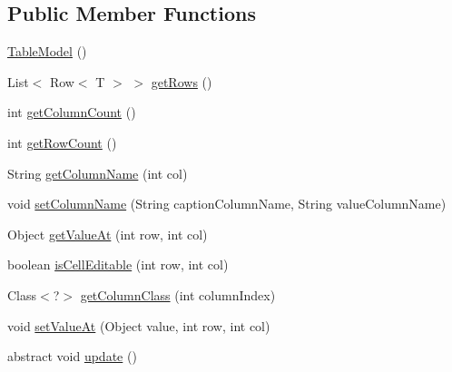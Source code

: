 \subsection*{Public Member Functions}
\begin{DoxyCompactItemize}
\item 
\hyperlink{classorg_1_1tzi_1_1use_1_1gui_1_1views_1_1selection_1_1_table_model_3_01_t_01_4_a16f7c6313c88dd4999036656af0accc9}{Table\-Model} ()
\item 
List$<$ Row$<$ T $>$ $>$ \hyperlink{classorg_1_1tzi_1_1use_1_1gui_1_1views_1_1selection_1_1_table_model_3_01_t_01_4_a46b8d7bab4b7870f022a4f12d6571108}{get\-Rows} ()
\item 
int \hyperlink{classorg_1_1tzi_1_1use_1_1gui_1_1views_1_1selection_1_1_table_model_3_01_t_01_4_ab132ea80bf2adb4d18b58912a6caa40a}{get\-Column\-Count} ()
\item 
int \hyperlink{classorg_1_1tzi_1_1use_1_1gui_1_1views_1_1selection_1_1_table_model_3_01_t_01_4_a438db9b60f02813f4e7b59530810dff0}{get\-Row\-Count} ()
\item 
String \hyperlink{classorg_1_1tzi_1_1use_1_1gui_1_1views_1_1selection_1_1_table_model_3_01_t_01_4_a64557d5fd2ad4e112a0c11144570a557}{get\-Column\-Name} (int col)
\item 
void \hyperlink{classorg_1_1tzi_1_1use_1_1gui_1_1views_1_1selection_1_1_table_model_3_01_t_01_4_a6373f383d0f22cdaef0c248a069d55da}{set\-Column\-Name} (String caption\-Column\-Name, String value\-Column\-Name)
\item 
Object \hyperlink{classorg_1_1tzi_1_1use_1_1gui_1_1views_1_1selection_1_1_table_model_3_01_t_01_4_ae2acd70d11e4b3e314967b1f80d155b6}{get\-Value\-At} (int row, int col)
\item 
boolean \hyperlink{classorg_1_1tzi_1_1use_1_1gui_1_1views_1_1selection_1_1_table_model_3_01_t_01_4_aaa0e99a59af0d4fa9681d0f3dd00b615}{is\-Cell\-Editable} (int row, int col)
\item 
Class$<$?$>$ \hyperlink{classorg_1_1tzi_1_1use_1_1gui_1_1views_1_1selection_1_1_table_model_3_01_t_01_4_a1234941580b1cede798f56dbf2eed43b}{get\-Column\-Class} (int column\-Index)
\item 
void \hyperlink{classorg_1_1tzi_1_1use_1_1gui_1_1views_1_1selection_1_1_table_model_3_01_t_01_4_a60cf191082a94b408f577803cb5ff709}{set\-Value\-At} (Object value, int row, int col)
\item 
abstract void \hyperlink{classorg_1_1tzi_1_1use_1_1gui_1_1views_1_1selection_1_1_table_model_3_01_t_01_4_ae564de058ca9497ff4226498e9b55f43}{update} ()
\end{DoxyCompactItemize}

